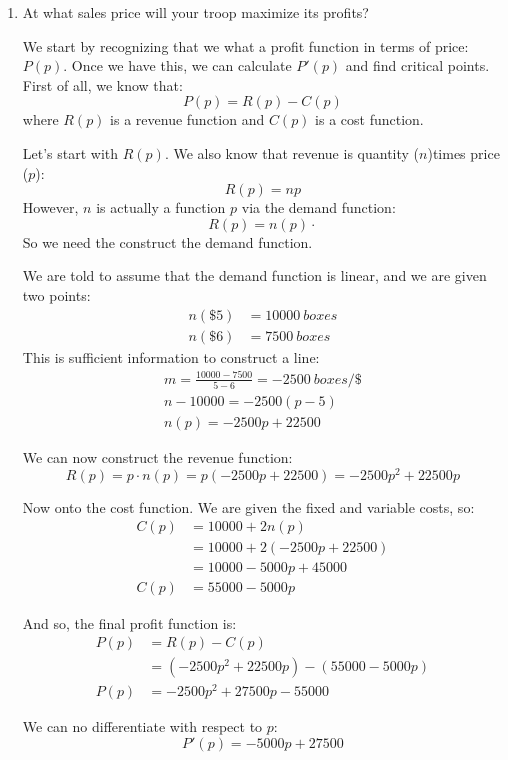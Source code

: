 \documentclass[letterpaper,12pt,fleqn]{article}
\begin{document}
\begin{enumerate}
\item At what sales price will your troop maximize its profits?

  We start by recognizing that we what a profit function in terms of price: \(P(p)\).  Once we have this, we can calculate
  \(P'(p)\) and find critical points.  First of all, we know that:
  \[P(p)=R(p)-C(p)\]
  where \(R(p)\) is a revenue function and \(C(p)\) is a cost function.

  Let's start with \(R(p)\).  We also know that revenue is quantity (\(n\))times price (\(p\)):
  \[R(p)=np\]
  However, \(n\) is actually a function \(p\) via the demand function:
  \[R(p)=n(p)\cdotp\]
  So we need the construct the demand function.

  We are told to assume that the demand function is linear, and we are given two points:
  \begin{align*}
    n(\$5) &= \SI{10000}{boxes} \\
    n(\$6) &= \SI{7500}{boxes}
  \end{align*}
  This is sufficient information to construct a line:
  \begin{gather*}
    m=\frac{10000-7500}{5-6}=\SI{-2500}{boxes/\$} \\
    n-10000=-2500(p-5) \\
    n(p)=-2500p+22500
  \end{gather*}

  We can now construct the revenue function:
  \[R(p)=p\cdot n(p)=p(-2500p+22500)=-2500p^2+22500p\]

  Now onto the cost function.  We are given the fixed and variable costs, so:
  \begin{align*}
    C(p) &= 10000+2n(p) \\
    &= 10000+2(-2500p+22500) \\
    &= 10000-5000p+45000 \\
    C(p) &= 55000-5000p
  \end{align*}

  And so, the final profit function is:
  \begin{align*}
    P(p) &= R(p)-C(p) \\
    &= (-2500p^2+22500p)-(55000-5000p) \\
    P(p) &= -2500p^2+27500p-55000
  \end{align*}

  We can no differentiate with respect to \(p\):
  \[P'(p)=-5000p+27500\]


\end{enumerate}
\end{document}
